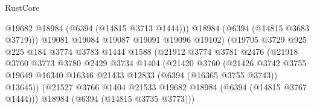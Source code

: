 \begin{lexlean}{RustCore}
\begin{coremodule}
                                          @19682
                                          @18984
                                          (@6394 (@14815 @3713 @1444)))
                                        @18984
                                        (@6394 (@14815 @3683 @3719)))
                                      @19081
                                      @19084
                                      @19087
                                      @19091
                                      @19096
                                      @19102)
                                    (@19705
                                      @3729
                                      @925
                                      @225
                                      @184
                                      @3774
                                      @3783
                                      @1444
                                      @1588
                                      (@21912
                                        @3774
                                        @3781
                                        @2476
                                        (@21918
                                          @3760
                                          @3773
                                          @3780
                                          @2429
                                          @3734
                                          @1404
                                          (@21420
                                            @3760
                                            (@21426
                                              @3742
                                              @3755
                                              @19649
                                              @16340
                                              @16346
                                              @21433
                                              @12833
                                              (@6394 (@16365 @3755 @3743))
                                              @13645))
                                          (@21527
                                            @3766
                                            @1404
                                            @21533
                                            @19682
                                            @18984
                                            (@6394 (@14815 @3767 @1444)))
                                          @18984
                                          (@6394 (@14815 @3735 @3773)))

\end{coremodule}
\end{lexlean}
